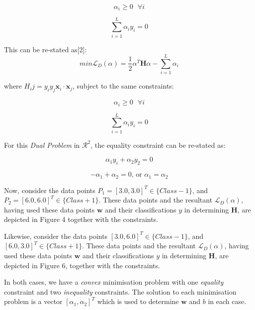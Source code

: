 \documentclass[10pt, a4paper,reqno]{amsart}
\begin{document}
\begin{equation}
\alpha_i\geq0\text{ }\forall{i}
\end{equation}

\begin{equation}
\sum_{i=1}^{L}\alpha_i y_i = 0
\end{equation}

This can be re-stated as[2]:
\begin{equation}
min\mathcal{L}_D(\alpha) = \frac{1}{2}\alpha^T\mathbf{H}\alpha - \sum_{i=1}^{L}\alpha_i
\end{equation}

where $H_ij = y_i y_j \mathbf{x}_i\cdot\mathbf{x}_j$, subject to the same constraints:

\begin{equation}
\alpha_i\geq0\text{ }\forall{i}
\end{equation}

\begin{equation}
\sum_{i=1}^{L}\alpha_i y_i = 0
\end{equation}

For this \emph{Dual Problem} in $\mathcal{R}^2$, the equality constraint can be re-stated as:

\begin{equation}
\alpha_1 y_i + \alpha_2 y_2 = 0
\end{equation}

\begin{equation}
-\alpha_1 + \alpha_2 = 0\text{, or }\alpha_1 = \alpha_2
\end{equation}

Now, consider the data points $P_1 = [3.0, 3.0]^T \in \{Class -1\}$, and $P_2 = [6.0, 6.0]^T \in \{Class +1\}$. These data points and the resultant $\mathcal{L}_D(\alpha)$, having used these data points $\mathbf{w}$ and their classifications $y$ in determining $\mathbf{H}$, are depicted in Figure 4 together with the constraints.

Likewise, consider the data points $[3.0, 6.0]^T \in \{Class -1\}$, and $[6.0, 3.0]^T \in \{Class +1\}$. These data points and the resultant $\mathcal{L}_D(\alpha)$, having used these data points $\mathbf{w}$ and their classifications $y$ in determining $\mathbf{H}$, are depicted in Figure 6, together with the constraints.

In both cases, we have a \emph{convex} minimisation problem with one \emph{equality} constraint and two \emph{inequality} constraints. The solution to each minimisation problem is a vector $[\alpha_1, \alpha_2]^T$ which is used to determine $\mathbf{w}$ and $b$ in each case.
\end{document}

